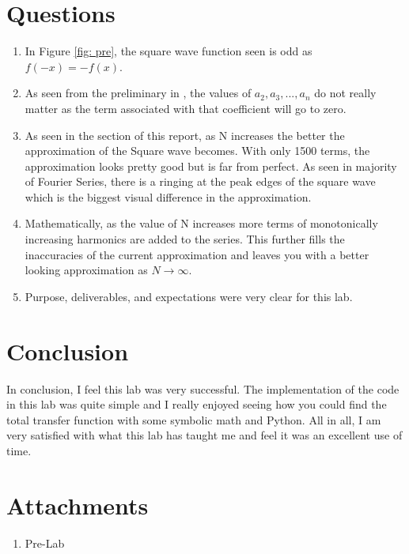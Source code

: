 \documentclass[12pt]{report}
\begin{document}
\section{Questions}
\begin{enumerate}
  \item In Figure \ref{fig: pre}, the square wave function seen is odd as $f(-x)=-f(x)$.
  \item As seen from the preliminary in , the values of $a_2, a_3, ... , a_n$ do not really matter as the term associated with that
  coefficient will go to zero.
  \item As seen in the  section of this report, as N increases the better the approximation of the Square wave becomes. With only 1500
  terms, the approximation looks pretty good but is far from perfect. As seen in majority of Fourier Series, there is a ringing at the peak edges of the square
  wave which is the biggest visual difference in the approximation.
  \item Mathematically, as the value of N increases more terms of monotonically increasing harmonics are added to the series. This further fills the inaccuracies
  of the current approximation and leaves you with a better looking approximation as $N\to\infty$.
  \item Purpose, deliverables, and expectations were very clear for this lab.
\end{enumerate}
\section{Conclusion}
In conclusion, I feel this lab was very successful. The implementation of the code in this lab was quite simple and I really enjoyed seeing how you could
find the total transfer function with some symbolic math and Python. All in all, I am very satisfied with what this lab has taught me and feel it was an 
excellent use of time.
\newpage
\thispagestyle{customblank}
\section{Attachments}\label{section: Attachments}
\centering\begin{enumerate}
  \item Pre-Lab
\end{enumerate}
\vspace*{\fill}


% 


\end{document}

